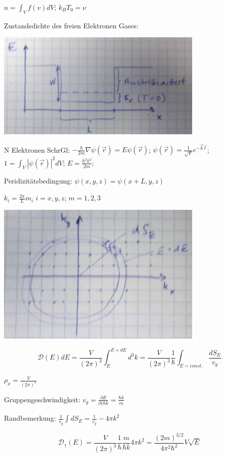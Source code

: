 \(n=\int_V f(v) dV\); \(k_BT_0 = \nu\)

Zustandsdichte des freien Elektronen Gases:

\includegraphics[width=0.75\textwidth]{kap06_23.png}

N Elektronen
SchrGl: \(-\frac{\hbar}{2m} \nabla \psi(\vec r) = E \psi(\vec r)\); \(\psi(\vec r) = \frac{1}{\sqrt{V}} e^{-\vec k\vec r}\); \(1=\int_V|\psi(\vec r)|^2dV\); \(E=\frac{\hbar^2k^2}{2m}\);

Peridizitätsbedingung:  \(\psi(x,y,z) = \psi(x+L,y,z)\)

\(k_i=\frac{2\pi}{L}m_i\) \(i=x,y,z\); \(m=1,2,3\)

\includegraphics[width=0.75\textwidth]{kap06_24.png}

\[\mathcal D(E) dE = \frac{V}{(2\pi)^3}\int^{E+dE}_E d^3 k = \frac{V}{(2\pi)^3} \frac{1}{\hbar} \int_{E=const.} \frac{dS_E}{v_g}\]

\(\rho_x = \frac{V}{(2\pi)^3}\)

Gruppengeschwindigkeit: \(v_g = \frac{\partial E}{\partial(\hbar k} = \frac{\hbar k}{m}\)

Randbemerkung: \(\frac{1}{v_g}\int dS_E = \frac{1}{v_g}-4\pi k^2\)

\[\mathcal D_\uparrow(E) = \frac{V}{(2\pi)^3}\frac{1}{\hbar} \frac{m}{\hbar k}4\pi k^2 = \frac{(2m)^{3/2}}{4\pi^2\hbar^2} V\sqrt{E}\]

